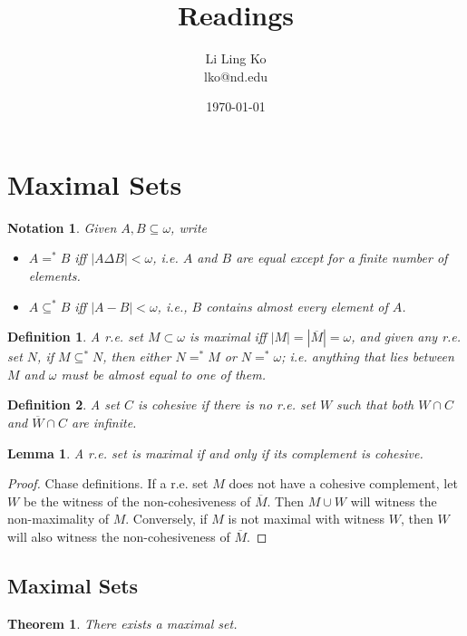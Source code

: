 \documentclass{article}
\newtheorem{notation}{Notation}[subsection]
\newtheorem{definition}{Definition}[subsection]
\newtheorem{lemma}{Lemma}[subsection]
\newtheorem{theorem}{Theorem}[subsection]
\begin{document}
\title{Readings}
\author{Li Ling Ko\\ lko@nd.edu}
\date{\today}
\maketitle

\section{Maximal Sets}
  \begin{notation}
    Given $A,B\subseteq\omega$, write
    \begin{itemize}
      \item $A=^*B$ iff $|A\Delta B|<\omega$, i.e. $A$ and $B$ are equal
        except for a finite number of elements.
      \item $A\subseteq^*B$ iff $|A-B|<\omega$, i.e., $B$ contains almost
        every element of $A$.
    \end{itemize}
  \end{notation}

  \begin{definition}
    A r.e. set $M\subset\omega$ is \textit{maximal} iff
    $|M|=|\overline{M}|=\omega$, and given any r.e. set $N$, if
    $M\subseteq^* N$, then either $N=^*M$ or $N=^*\omega$; i.e. anything
    that lies between $M$ and $\omega$ must be almost equal to one of them.
  \end{definition}

  \begin{definition}
    A set $C$ is \textit{cohesive} if there is no r.e. set $W$ such that
    both $W\cap C$ and $\overline{W}\cap C$ are infinite.
  \end{definition}

  \begin{lemma}
    A r.e. set is maximal if and only if its complement is cohesive.
    \label{lemma:maximal-cohesive}
  \end{lemma}
  \begin{proof}
    Chase definitions. If a r.e. set $M$ does not have a cohesive
    complement, let $W$ be the witness of the non-cohesiveness of
    $\overline{M}$. Then $M\cup W$ will witness the non-maximality of $M$.
    Conversely, if $M$ is not maximal with witness $W$, then $W$ will also
    witness the non-cohesiveness of $\overline{M}$.
  \end{proof}

\subsection{Maximal Sets}
  \begin{theorem}
    There exists a maximal set.
  \end{theorem}
\end{document}
